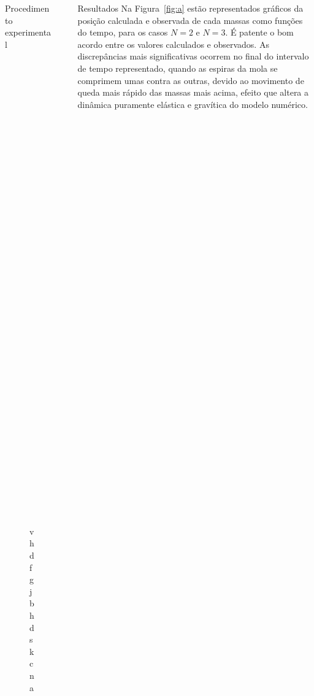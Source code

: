 \documentclass[final]{beamer}
\newlength{\sepwidth}
\newlength{\colwidth}
\newcommand{\separatorcolumn}{\begin{column}{\sepwidth}\end{column}}
\begin{document}
\begin{frame}[t]
\begin{columns}[t]
\begin{column}{\colwidth}
\begin{block}{Procedimento experimental}
\begin{center}
\begin{figure}
\includegraphics[height=20cm]{images/comJoao.jpeg}
\caption{vhdfgjbhdskcna}
\end{figure}
\end{center}
\end{block}
\end{column}

\separatorcolumn
\begin{column}{\colwidth}
\begin{block}{Resultados}
Na Figura~\ref{fig:a}  estão representados gráficos da posição calculada e
observada de cada massas como funções do tempo, para os casos $N=2$ e $N=3$. É
patente o bom acordo entre os valores calculados e observados. As discrepâncias
mais significativas ocorrem no final do intervalo de tempo representado, quando
as espiras da mola se comprimem umas contra as outras, devido ao movimento de
queda mais rápido das massas mais acima, efeito que altera a dinâmica puramente
elástica e gravítica do modelo numérico.


\end{block}
\end{column}
\end{columns}
\end{frame}
\end{document}
